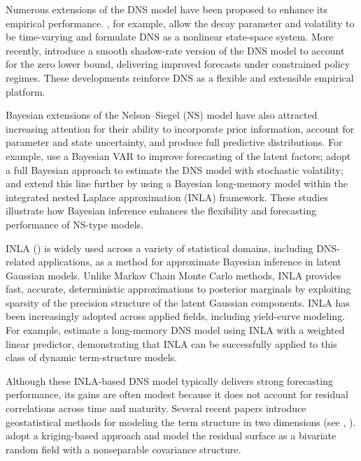 \documentclass[
  12pt]{article}
\newcommand{\citeay}[1]{\citeauthor{#1}, \citeyear{#1}}
\begin{document}
Numerous extensions of the DNS model have been proposed to enhance its empirical performance. \cite{koopman2010analyzing}, for example, allow the decay parameter and volatility to be time-varying and formulate DNS as a nonlinear state-space system. More recently, \cite{opschoor2025smooth} introduce a smooth shadow-rate version of the DNS model to account for the zero lower bound, delivering improved forecasts under constrained policy regimes. These developments reinforce DNS as a flexible and extensible empirical platform.

Bayesian extensions of the Nelson--Siegel (NS) model have also attracted increasing attention for their ability to incorporate prior information, account for parameter and state uncertainty, and produce full predictive distributions. For example, \cite{carriero2012forecasting} use a Bayesian VAR to improve forecasting of the latent factors; \cite{laurini2014forecasting} adopt a full Bayesian approach to estimate the DNS model with stochastic volatility; and \cite{valente2024bayesian} extend this line further by using a Bayesian long-memory model within the integrated nested Laplace approximation (INLA) framework. These studies illustrate how Bayesian inference enhances the flexibility and forecasting performance of NS-type models.

INLA (\cite{rue2009approximate}) is widely used across a variety of statistical domains, including DNS-related applications, as a method for approximate Bayesian inference in latent Gaussian models. Unlike Markov Chain Monte Carlo methods, INLA provides fast, accurate, deterministic approximations to posterior marginals by exploiting sparsity of the precision structure of the latent Gaussian components. INLA has been increasingly adopted across applied fields, including yield-curve modeling. For example, \cite{valente2024bayesian} estimate a long-memory DNS model using INLA with a weighted linear predictor, demonstrating that INLA can be successfully applied to this class of dynamic term-structure models.

Although these INLA-based DNS model typically delivers strong forecasting performance, its gains are often modest because it does not account for residual correlations across time and maturity. Several recent papers introduce geostatistical methods for modeling the term structure in two dimensions (see \citeay{arbia2015forecasting}). \cite{congedi2025term} adopt a kriging-based approach and model the residual surface as a bivariate random field with a nonseparable covariance structure.
\end{document}
